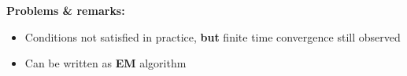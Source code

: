 \documentclass[a0paper,portrait]{baposter}
\begin{document}
\begin{poster}
{\begin{center}
  
  \end{center}
  \vspace{-0.3cm}
  \textbf{Problems \& remarks: }
  \vspace{-0.2cm}
\begin{itemize}[leftmargin=*]
\item Conditions not satisfied in practice, \textbf{but} finite time convergence still observed
  \vspace{-0.2cm}
\item Can be written as \textbf{EM} algorithm
\end{itemize}
}





\end{poster}
\end{document}
